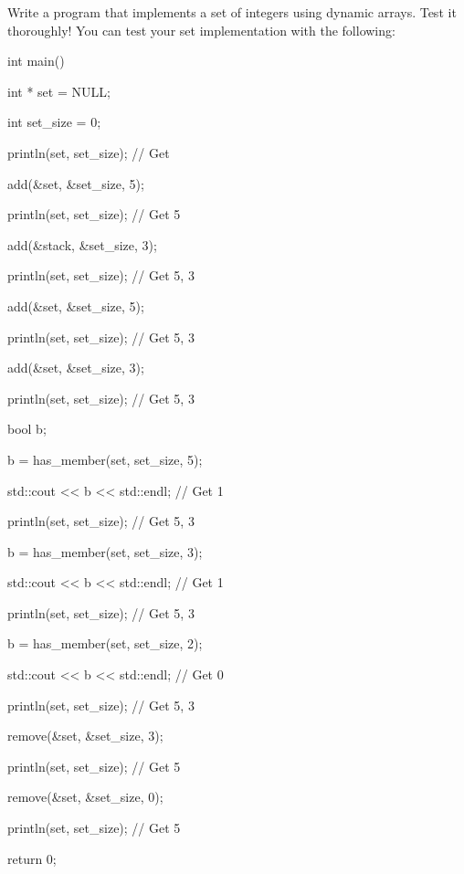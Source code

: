 Write a program that implements a set of integers using dynamic arrays. Test it thoroughly! You can test your set implementation with the following:



\begin{consolethree}[escapeinside=||]

int main()

{

    int * set = NULL;

    int set_size = 0;

    println(set, set_size); // Get {}

    add(&set, &set_size, 5);

    println(set, set_size); // Get {5}

    add(&stack, &set_size, 3);

    println(set, set_size); // Get {5, 3}

    add(&set, &set_size, 5);

    println(set, set_size); // Get {5, 3}

    add(&set, &set_size, 3);

    println(set, set_size); // Get {5, 3}

    bool b;

    b = has_member(set, set_size, 5);

    std::cout << b << std::endl; // Get 1

    println(set, set_size); // Get {5, 3}

    b = has_member(set, set_size, 3);

    std::cout << b << std::endl; // Get 1

    println(set, set_size); // Get {5, 3}

    b = has_member(set, set_size, 2);

    std::cout << b << std::endl; // Get 0

    println(set, set_size); // Get {5, 3}

    remove(&set, &set_size, 3);

    println(set, set_size); // Get {5}

    remove(&set, &set_size, 0);

    println(set, set_size); // Get {5}

    return 0;

}

\end{consolethree}

